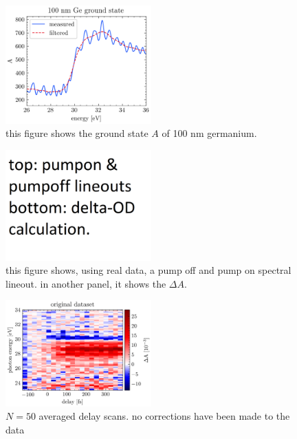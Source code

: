 \begin{figure}
	\centering
	\includegraphics[width=0.5\textwidth]{figures/chap3/Ge_100nm_ground_state.png}
	\caption{this figure shows the ground state $A$ of 100 nm germanium.}
	\label{fig:Ge_100nm_ground_state}
\end{figure}

\begin{figure}
	\centering
	\includegraphics[width=0.5\textwidth]{figures/chap3/PumpOn_vs_PumpOff.png}
	\caption{this figure shows, using real data, a pump off and pump on spectral lineout. in another panel, it shows the $\Delta A$.}
	\label{fig:PumpOn_vs_PumpOff}
\end{figure}

\begin{figure}
	\centering
	\includegraphics[width=0.5\textwidth]{figures/chap3/Ge_uncorrected_raw_spectrogram.png}
	\caption{$N=50$ averaged delay scans. no corrections have been made to the data}
	\label{fig:Ge_uncorrected_raw_spectrogram}
\end{figure}

